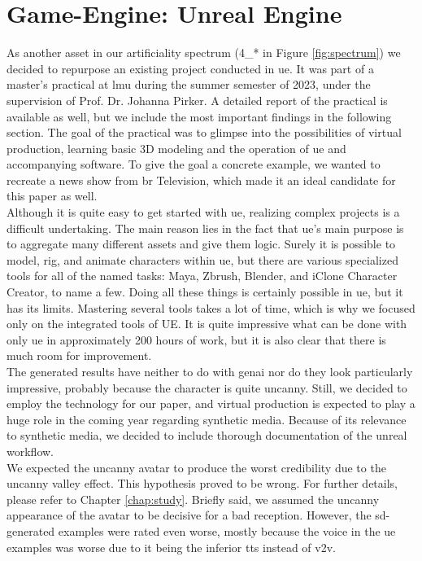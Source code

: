 \documentclass[
  a4paper,  %
  twoside,  %
  bibliography=totoc,
  headsepline,
  cleardoublepage=empty,
  parskip=half,
  draft=false
]{scrbook}
\begin{document}
\section{Game-Engine: Unreal Engine}
As another asset in our artificiality spectrum (4\_* in Figure \ref{fig:spectrum}) we decided to repurpose an existing project conducted in \gls{ue}. It was part of a master's practical at \gls{lmu} during the summer semester of 2023, under the supervision of Prof. Dr. Johanna Pirker. A detailed report of the practical is available as well, but we include the most important findings in the following section. The goal of the practical was to glimpse into the possibilities of virtual production, learning basic 3D modeling and the operation of \gls{ue} and accompanying software. To give the goal a concrete example, we wanted to recreate a news show from \gls{br} Television, which made it an ideal candidate for this paper as well. \\
Although it is quite easy to get started with \gls{ue}, realizing complex projects is a difficult undertaking. The main reason lies in the fact that \gls{ue}'s main purpose is to aggregate many different assets and give them logic. Surely it is possible to model, rig, and animate characters within \gls{ue}, but there are various specialized tools for all of the named tasks: Maya, Zbrush, Blender, and iClone Character Creator, to name a few. Doing all these things is certainly possible in \gls{ue}, but it has its limits. Mastering several tools takes a lot of time, which is why we focused only on the integrated tools of UE. It is quite impressive what can be done with only \gls{ue} in approximately 200 hours of work, but it is also clear that there is much room for improvement. \\
The generated results have neither to do with \gls{genai} nor do they look particularly impressive, probably because the character is quite uncanny. Still, we decided to employ the technology for our paper, and virtual production is expected to play a huge role in the coming year regarding synthetic media. Because of its relevance to synthetic media, we decided to include thorough documentation of the unreal workflow. \\
We expected the uncanny avatar to produce the worst credibility due to the uncanny valley effect. This hypothesis proved to be wrong. For further details, please refer to Chapter \ref{chap:study}. Briefly said, we assumed the uncanny appearance of the avatar to be decisive for a bad reception. However, the \gls{sd}-generated examples were rated even worse, mostly because the voice in the \gls{ue} examples was worse due to it being the inferior \gls{tts} instead of \gls{v2v}.
\end{document}
